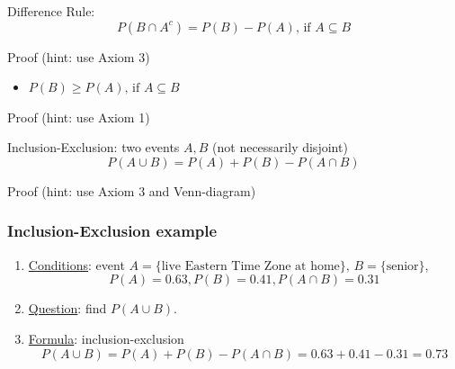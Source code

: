 \documentclass[slidestop,compress,mathserif]{beamer}
\begin{document}
\begin{frame}%
\begin{dinglist}{\DingListSymbolA}
\item Difference Rule:
\[  P(B \cap A^c) = P(B)-P(A) \text{, if } A \subseteq B \]
\end{dinglist}
Proof (hint: use Axiom 3)


\vspace{3cm}
\pause
\begin{itemize}
\item $ P(B) \geq P(A) \text{, if } A \subseteq B $
\end{itemize}
Proof (hint: use Axiom 1)

\end{frame}


\begin{frame}%
\begin{dinglist}{\DingListSymbolA}
\item Inclusion-Exclusion: two events $A, B$ (not necessarily disjoint)
  \[ P(A \cup B) = P(A) + P(B) - P(A \cap B) \]
\end{dinglist}
Proof (hint: use Axiom 3 and Venn-diagram)



\end{frame}


\begin{frame}\frametitle{Inclusion-Exclusion example}
\pause
\begin{enumerate}
\item \underline{Conditions}: event $A = \{\text{live Eastern Time Zone at home}\}$, $B = \{ \text{senior} \}$,
\[P(A) = 0.63, P(B) = 0.41, P(A \cap B) = 0.31\] \pause\vspace{-0.5cm}
\item \underline{Question}: find $P(A \cup B)$.\pause
\item \underline{Formula}: inclusion-exclusion
\[P(A \cup B) = P(A) + P(B) - P(A \cap B) = 0.63 + 0.41 - 0.31 = 0.73\]
\end{enumerate}


\end{frame}
\end{document}
